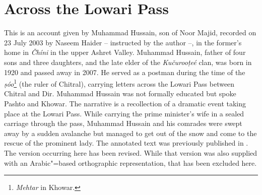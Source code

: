 \appendix
{}

\section*{Across the Lowari Pass}

This is an account given by Muhammad Hussain, son of Noor Majid, recorded on 23 July 2003 by Naseem Haider -- instructed by the author --, in the former’s home in \textit{Čhíni} in the upper Ashret Valley. Muhammad Hussain, father of four sons and three daughters, and the late elder of the \textit{Kučurooṭeé} clan, was born in 1920 and passed away in 2007. He served as a postman during the time of the \textit{ṣóo}\footnote{\textit{Mehtar} in Khowar.} (the ruler of Chitral), carrying letters across the Lowari Pass between Chitral and Dir. Muhammad Hussain was not formally educated but spoke Pashto and Khowar. The narrative is a recollection of a dramatic event taking place at the Lowari Pass. While carrying the prime minister’s wife in a sealed carriage through the pass, Muhammad Hussain and his comrades were swept away by a sudden avalanche but managed to get out of the snow and come to the rescue of the prominent lady. The annotated text was previously published in \citet[131--137]{liljegrenhaider2015}. The version occurring here has been revised. While that version was also supplied with an Arabic"=based orthographic representation, that has been excluded here.


